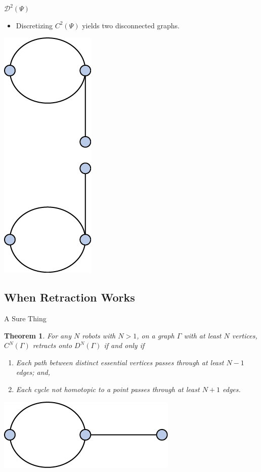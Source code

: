 \documentclass{beamer}
\newtheorem{thm}{Theorem}
\begin{document}
\begin{frame}{$\mathcal{D}^2(\Psi)$}
\begin{itemize}
\item Discretizing $C^2(\Psi)$ yields two disconnected graphs.\pause
\end{itemize}

\centering
\includegraphics[scale=.5]{Thesis/Bad_D.png}

\end{frame}

\subsection{When Retraction Works}
\begin{frame}{A Sure Thing}
\begin{thm}
For any $N$ robots with $N>1$, on a graph $\Gamma$ with at least $N$ vertices, $C^N(\Gamma)$ retracts onto $D^N(\Gamma)$ if and only if 

\begin{enumerate}
\item Each path between distinct essential vertices passes through at least $N-1$ edges; and,
\item Each cycle not homotopic to a point passes through at least $N+1$ edges.\cite{factory}
\end{enumerate}
\end{thm}

\vspace{.5cm}
\centering
\includegraphics[scale=.8]{Thesis/Bad.png}
\end{frame}
\end{document}
